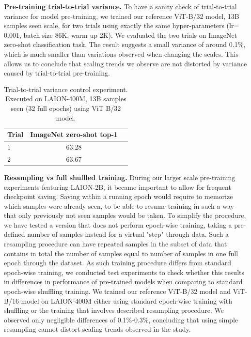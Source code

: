 \begin{appendix}
\textbf{Pre-training trial-to-trial variance.} To have a sanity check of trial-to-trial variance for model pre-training, we trained our reference ViT-B/32 model, 13B samples seen scale, for two trials using exactly the same hyper-parameters (lr=$0.001$, batch size 86K, warm up 2K). We evaluated the two trials on ImageNet zero-shot classification task. The result suggests a small variance of around 0.1\%, which is much smaller than variations observed when changing the scales. This allows us to conclude that scaling trends we observe are not distorted by variance caused by trial-to-trial pre-training.   
\begin{table}[!htb]
\setlength\tabcolsep{3.0pt}
    \centering
    \small
    \begin{tabular}{lcc}\toprule
       Trial  & ImageNet zero-shot top-1  \\ \midrule
        1 & 63.28 \\
        2 & 63.67 \\\bottomrule
    \end{tabular}
    \caption{
    Trial-to-trial variance control experiment. Executed on LAION-400M, 13B samples seen (32 full epochs) using ViT B/32 model.
    \vspace{-1em}
    }
    \label{tab:trial_to_trial}
\end{table}

\textbf{Resampling vs full shuffled training.} During our larger scale pre-training experiments featuring LAION-2B, it became important to allow for frequent checkpoint saving. Saving within a running epoch would require to memorize which samples were already seen, to be able to resume training in such a way that only previously not seen samples would be taken. To simplify the procedure, we have tested a version that does not perform epoch-wise training, taking a pre-defined number of samples instead for a virtual "step" through data. Such a resampling procedure can have repeated samples in the subset of data that contains in total the number of samples equal to number of samples in one full epoch through the dataset. As such training procedure differs from standard epoch-wise training, we conducted test experiments to check whether this results in differences in performance of pre-trained models when comparing to standard epoch-wise shuffling training. We trained our reference ViT-B/32 model and ViT-B/16 model on LAION-400M either using standard epoch-wise training with shuffling or the training that involves described resampling procedure. We observed only negligible differences of 0.1\%-0.3\%, concluding that using simple resampling cannot distort scaling trends observed in the study. 


\end{appendix}
